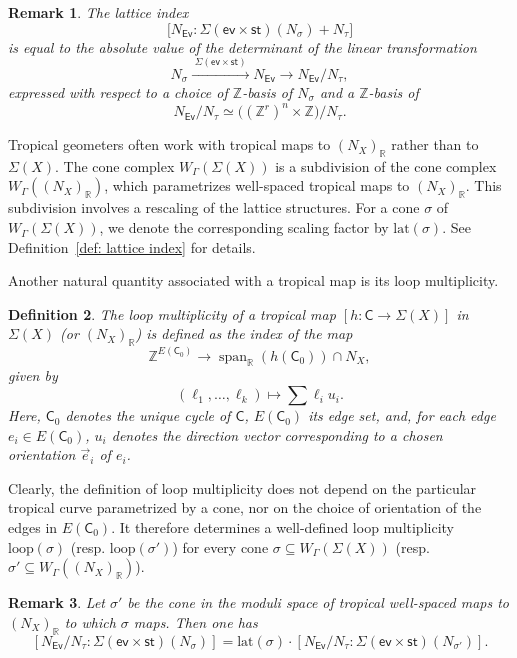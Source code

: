 \documentclass{article}
\def\R{\mathbb{R}}
\newtheorem{definition}{Definition}[section]
\newtheorem{remark}[definition]{Remark}
\newcommand{\tropC}{\mathsf{C}}
\begin{document}
\begin{remark}\label{rmk: lattice index is determinant}
    The lattice index
\[
\bigl[
N_{\mathsf{Ev}} :  \Sigma( \mathsf{ev} \times \mathsf{st})(N_\sigma) + N_\tau
\bigr]
\]
is equal to the absolute value of the determinant of the linear transformation
\[
N_\sigma \xrightarrow{\;\Sigma(\mathsf{ev} \times \mathsf{st})\;} N_{\mathsf{Ev}} \longrightarrow N_{\mathsf{Ev}}/ N_\tau,
\]
expressed with respect to a choice of $\mathbb{Z}$-basis of $N_\sigma$ and a $\mathbb{Z}$-basis of
\[
N_{\mathsf{Ev}}/ N_\tau \simeq \bigl((\mathbb{Z}^r)^n \times \mathbb{Z}\bigr) / N_\tau.
\]
\end{remark}

Tropical geometers often work with tropical maps to $(N_X)_{\mathbb{R}}$ rather than to $\Sigma(X)$. The cone complex $W_\Gamma(\Sigma(X))$ is a subdivision of the cone complex $W_\Gamma((N_X)_{\mathbb{R}})$, which parametrizes well-spaced tropical maps to $(N_X)_{\mathbb{R}}$. This subdivision involves a rescaling of the lattice structures. For a cone $\sigma$ of $W_{\Gamma}(\Sigma(X))$, we denote the corresponding scaling factor by $\mathrm{lat}(\sigma)$. See Definition~\ref{def: lattice index} for details.

Another natural quantity associated with a tropical map is its loop multiplicity.

\begin{definition}\label{def:loop}
The loop multiplicity of a tropical map $[h \colon \tropC \to \Sigma(X)]$ in $\Sigma(X)$ (or $(N_X)_\mathbb{R}$) is defined as the index of the map
\[
\mathbb{Z}^{E(\tropC_0)} \longrightarrow \operatorname{span}_{\mathbb{R}}(h(\tropC_0)) \cap N_X,
\]
given by
\[
(\ell_1, \ldots, \ell_k) \longmapsto \sum \ell_i u_i.
\]
Here, $\tropC_0$ denotes the unique cycle of $\tropC$, $E(\tropC_0)$ its edge set, and, for each edge $e_i \in E(\tropC_0)$, $u_i$ denotes the direction vector corresponding to a chosen orientation $\vec{e}_i$ of $e_i$.
\end{definition}

Clearly, the definition of loop multiplicity does not depend on the particular tropical curve parametrized by a cone, nor on the choice of orientation of the edges in $E(\tropC_0)$. It therefore determines a well-defined loop multiplicity $\mathrm{loop}(\sigma)$ (resp. $\mathrm{loop}(\sigma')$) for every cone $\sigma \subseteq W_\Gamma(\Sigma(X))$ (resp. $\sigma' \subseteq W_\Gamma((N_X)_\R)$).

\begin{remark}
Let $\sigma'$ be the cone in the moduli space of tropical well-spaced maps to $(N_X)_{\mathbb{R}}$ to which $\sigma$ maps. Then one has
\[
\left[
N_{\mathsf{Ev}}/N_\tau: \Sigma( \mathsf{ev} \times \mathsf{st})(N_\sigma)
\right]
=
\mathrm{lat}(\sigma) \cdot
\left[
N_{\mathsf{Ev}}/N_\tau : \Sigma( \mathsf{ev} \times \mathsf{st})(N_{\sigma'})
\right].
\]


\end{remark}
\end{document}
